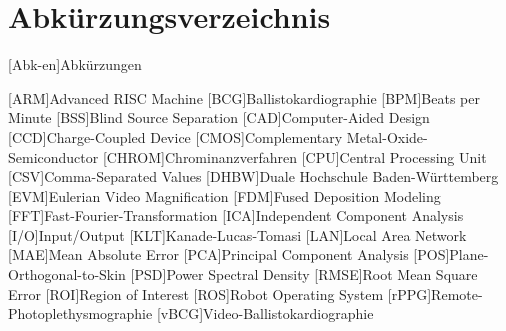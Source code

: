 
\chapter*{Abkürzungsverzeichnis}                   %

\begin{acronym}[DHBW]

 [Abk-en]{Abkürzungen}

 [ARM]{Advanced RISC Machine}
[BCG]{Ballisto\-kardiographie}
[BPM]{Beats per Minute}
[BSS]{Blind Source Sepa\-ration}
[CAD]{Computer-\-Aided Design}
[CCD]{Charge-\-Coupled Device}
[CMOS]{Complementary Metal-\-Oxide-\-Semiconductor}
[CHROM]{Chromi\-nanz\-verfahren}
[CPU]{Central Processing Unit}
[CSV]{Comma-\-Separated Values}
[DHBW]{Duale Hochschule Baden-\-Württemberg}
[EVM]{Eulerian Video Magni\-fication}
[FDM]{Fused Depo\-sition Modeling}
[FFT]{Fast-\-Fourier-\-Transformation}
[ICA]{Independent Component Ana\-lysis}
[I/O]{Input/Output}
[KLT]{Kanade-\-Lucas-\-Tomasi}
[LAN]{Local Area Network}
[MAE]{Mean Absolute Error}
[PCA]{Principal Component Ana\-lysis}
[POS]{Plane-\-Orthogonal-\-to-\-Skin}
[PSD]{Power Spectral Density}
[RMSE]{Root Mean Square Error}
[ROI]{Region of Interest}
[ROS]{Robot Operating System}
[rPPG]{Remote-\-Photo\-plethysmo\-graphie}
[vBCG]{Video-Ballisto\-kardio\-graphie}
\end{acronym}
